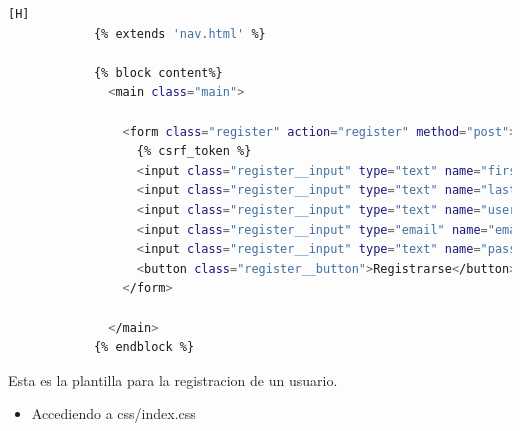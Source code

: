 \documentclass{article}
\begin{document}
            \begin{lstlisting}[language=bash,caption={register.html}][H]
            {% extends 'nav.html' %}
            
            {% block content%}
              <main class="main">
                
                <form class="register" action="register" method="post">
                  {% csrf_token %}
                  <input class="register__input" type="text" name="first_name" placeholder="Nombre">
                  <input class="register__input" type="text" name="last_name" placeholder="Apellido">
                  <input class="register__input" type="text" name="username" placeholder="Nombre de Usuario">
                  <input class="register__input" type="email" name="email" placeholder="Email">
                  <input class="register__input" type="text" name="password" placeholder="Contraseña">
                  <button class="register__button">Registrarse</button>
                </form>
            
              </main>
            {% endblock %}
	\end{lstlisting}
 
            Esta es la plantilla para la registracion de un usuario.

            \begin{itemize}
                \item Accediendo a css/index.css
            \end{itemize}
            
\end{document}
